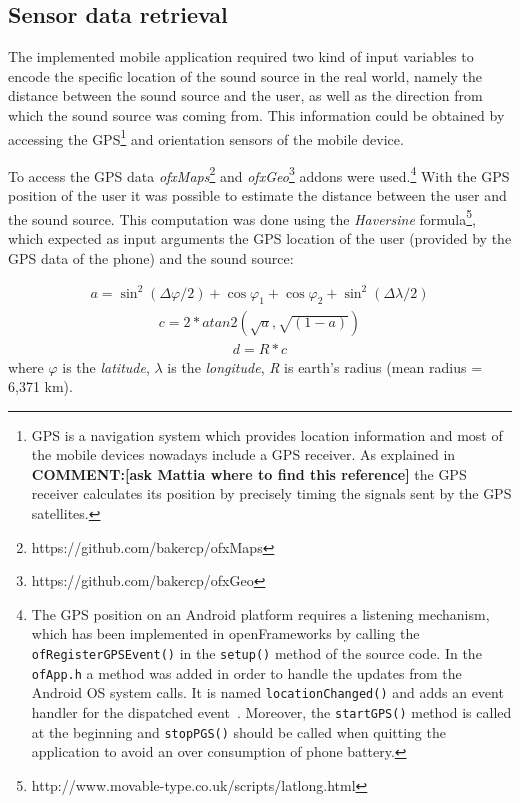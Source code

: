 \documentclass[journal]{IEEEtran}
\begin{document}
\subsection{Sensor data retrieval}
The implemented mobile application required two kind of input variables to encode the specific location of the sound source in the real world, namely the distance between the sound source and the user, as well as the direction from which the sound source was coming from. This information could be obtained by accessing the GPS\footnote{GPS is a navigation system which provides location information and most of the mobile devices nowadays include a GPS receiver. As explained in~\cite{noble2009} \textbf{COMMENT:[ask Mattia where to find this reference]} the GPS receiver calculates its position by precisely timing the signals sent by the GPS satellites.} and orientation sensors of the mobile device. 

To access the GPS data \emph{ofxMaps}\footnote{https://github.com/bakercp/ofxMaps} and \emph{ofxGeo}\footnote{https://github.com/bakercp/ofxGeo} addons were used.\footnote{The GPS position on an Android platform requires a listening mechanism, which has been implemented in openFrameworks by calling the \texttt{ofRegisterGPSEvent()} in the \texttt{setup()} method of the source code. In the \texttt{ofApp.h} a method was added in order to handle the updates from the Android OS system calls. It is named \texttt{locationChanged()} and adds an event handler for the dispatched event~\cite{noble2009}. Moreover, the \texttt{startGPS()} method is called at the beginning and \texttt{stopPGS()} should be called when quitting the application to avoid an over consumption of phone battery.} With the GPS position of the user it was possible to estimate the distance between the user and the sound source. This computation was done using the \textit{Haversine} formula\footnote{http://www.movable-type.co.uk/scripts/latlong.html}, which expected as input arguments the GPS location of the user (provided by the GPS data of the phone) and the sound source:

\begin{equation}\label{eq:distancehaversine1}
\begin{split}
  a = {\sin}^{2}(\Delta\varphi / 2) + \cos \varphi _1 + \cos \varphi _2 + \sin^2(\Delta\lambda / 2)
\end{split}
\end{equation}
\begin{equation}\label{eq:distancehaversine2}
\begin{split}
  c = 2 * atan2(\sqrt{a},\sqrt{(1-a)}) 
\end{split}
\end{equation}
\begin{equation}\label{eq:distancehaversine3}
\begin{split}
  d = R * c
\end{split}
\end{equation}
where $\varphi$ is the \emph{latitude}, $\lambda$ is the \emph{longitude}, \emph{R} is earth's radius (mean radius = 6,371 km).
\end{document}
